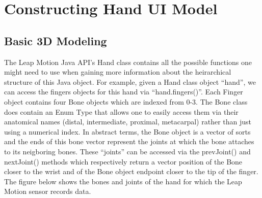 
\chapter{Constructing Hand UI Model} %

\label{Chapter2}


\section{Basic 3D Modeling}

	The Leap Motion Java API’s Hand class contains all the possible functions one might need to use when gaining more information about the heirarchical structure of this Java object. For example, given a Hand class object “hand”, we can access the fingers objects for this hand via “hand.fingers()”.  Each Finger object contains four Bone objects which are indexed from 0-3. The Bone class does contain an Enum Type that allows one to easily access them via their anatomical names (distal, intermediate, proximal, metacarpal) rather than just using a numerical index. In abstract terms, the Bone object is a vector of sorts and the ends of this bone vector represent the joints at which the bone attaches to its neigboring bones. These “joints” can be accessed via the prevJoint() and nextJoint() methods which respectively return a vector position of the Bone closer to the wrist and of the Bone object endpoint closer to the tip of the finger. The figure below shows the bones and joints of the hand for which the Leap Motion sensor records data. 

